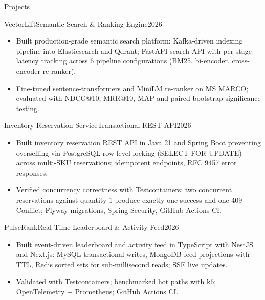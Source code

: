 \documentclass[]{mcdowellcv}
\begin{document}
\begin{cvsection}{Projects}
  \begin{cvsubsection}{VectorLift}{Semantic Search \& Ranking Engine}{2026}
    \begin{itemize}
      \item Built production-grade semantic search platform: Kafka-driven indexing pipeline into Elasticsearch and Qdrant; FastAPI search API with per-stage latency tracking across 6 pipeline configurations (BM25, bi-encoder, cross-encoder re-ranker).
      \item Fine-tuned sentence-transformers and MiniLM re-ranker on MS MARCO; evaluated with NDCG@10, MRR@10, MAP and paired bootstrap significance testing.
    \end{itemize}
    \vspace{-1.5pt}
  \end{cvsubsection}

  \begin{cvsubsection}{Inventory Reservation Service}{Transactional REST API}{2026}
    \begin{itemize}
      \item Built inventory reservation REST API in Java 21 and Spring Boot preventing overselling via PostgreSQL row-level locking (SELECT FOR UPDATE) across multi-SKU reservations; idempotent endpoints, RFC 9457 error responses.
      \item Verified concurrency correctness with Testcontainers: two concurrent reservations against quantity 1 produce exactly one success and one 409 Conflict; Flyway migrations, Spring Security, GitHub Actions CI.
    \end{itemize}
    \vspace{-1.5pt}
  \end{cvsubsection}

  \begin{cvsubsection}{PulseRank}{Real-Time Leaderboard \& Activity Feed}{2026}
    \begin{itemize}
      \item Built event-driven leaderboard and activity feed in TypeScript with NestJS and Next.js: MySQL transactional writes, MongoDB feed projections with TTL, Redis sorted sets for sub-millisecond reads; SSE live updates.
      \item Validated with Testcontainers; benchmarked hot paths with k6; OpenTelemetry + Prometheus; GitHub Actions CI.
    \end{itemize}
  \end{cvsubsection}
\end{cvsection}
\end{document}
